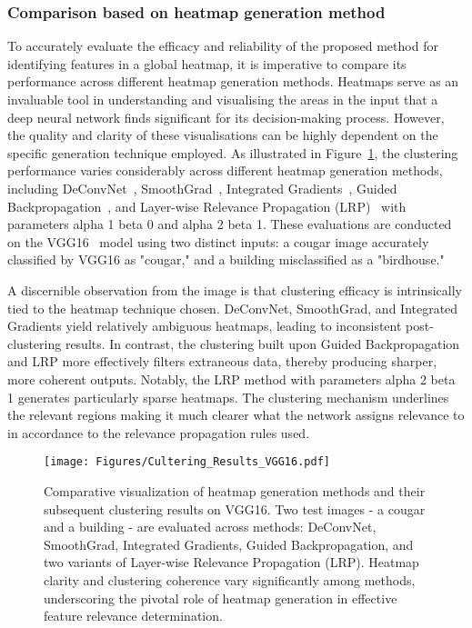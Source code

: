 \subsubsection{Comparison based on heatmap generation method}

To accurately evaluate the efficacy and reliability of the proposed method for identifying features in a global heatmap, it is imperative to compare its performance across different heatmap generation methods. Heatmaps serve as an invaluable tool in understanding and visualising the areas in the input that a deep neural network finds significant for its decision-making process. However, the quality and clarity of these visualisations can be highly dependent on the specific generation technique employed. As illustrated in Figure~\ref{Fig:vgg16}, the clustering performance varies considerably across different heatmap generation methods, including DeConvNet~\cite{ZeilerKTF10}, SmoothGrad~\cite{SmilkovTKVW17}, Integrated Gradients~\cite{SundararajanTY17}, Guided Backpropagation~\cite{SpringenbergDBR14}, and Layer-wise Relevance Propagation (LRP)~\cite{bach2015pixel} with parameters alpha 1 beta 0 and alpha 2 beta 1. These evaluations are conducted on the VGG16~\cite{SimonyanZ14a} model using two distinct inputs: a cougar image accurately classified by VGG16 as "cougar," and a building misclassified as a "birdhouse." 

A discernible observation from the image is that clustering efficacy is intrinsically tied to the heatmap technique chosen. DeConvNet, SmoothGrad, and Integrated Gradients yield relatively ambiguous heatmaps, leading to inconsistent post-clustering results. In contrast, the clustering built upon Guided Backpropagation and LRP more effectively filters extraneous data, thereby producing sharper, more coherent outputs. Notably, the LRP method with parameters alpha 2 beta 1 generates particularly sparse heatmaps. The clustering mechanism underlines the relevant regions making it much clearer what the network assigns relevance to in accordance to the relevance propagation rules used. 

\begin{figure}[ht!]
\begin{center}
\texttt{[image: Figures/Cultering\_Results\_VGG16.pdf]}
\end{center}
\caption{Comparative visualization of heatmap generation methods and their subsequent clustering results on VGG16. Two test images - a cougar and a building - are evaluated across methods: DeConvNet, SmoothGrad, Integrated Gradients, Guided Backpropagation, and two variants of Layer-wise Relevance Propagation (LRP). Heatmap clarity and clustering coherence vary significantly among methods, underscoring the pivotal role of heatmap generation in effective feature relevance determination.}
\label{Fig:vgg16}
\end{figure} 

